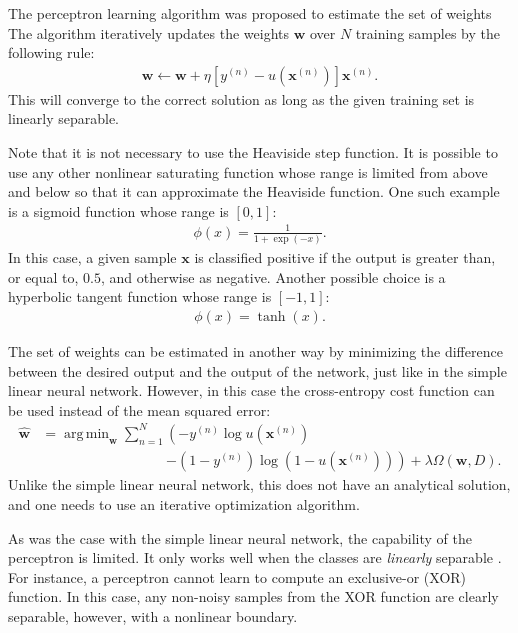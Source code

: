 \documentclass[dissertation,nocontribution,draft*]{aaltoseries}
\newcommand{\vect}[1]{\mathbf{#1}}
\newcommand{\vx}[0]{\vect{x}}
\newcommand{\vw}[0]{\vect{w}}
\DeclareMathOperator*{\argmin}{arg\,min}
\begin{document}
The perceptron learning algorithm was proposed  to estimate
the set of weights
The algorithm iteratively updates the
weights $\vw$ over $N$ training samples by the following
rule:
\begin{align*}
    \vw \leftarrow \vw + \eta \left[ y^{(n)} -
    u\left(\vx^{(n)}\right)
    \right] \vx^{(n)}.
\end{align*}
This will converge to the correct solution as long as the
given training set is linearly separable.

Note that it is not necessary to use the Heaviside step
function. It is possible to use any other nonlinear
saturating function whose range is limited from above and
below so that it can approximate the Heaviside function.
One such example is a sigmoid function whose range is
$\left[ 0, 1 \right]$:
\begin{align}
    \label{eq:sigmoid}
    \phi(x) = \frac{1}{1 + \exp\left( -x\right)}.
\end{align}
In this case, a given sample $\vx$ is classified positive if
the output is greater than, or equal to, $0.5$, and
otherwise as negative. Another possible choice is a
hyperbolic tangent function whose range is $\left[ -1, 1
\right]$:
\begin{align}
    \label{eq:tanh}
    \phi(x) = \tanh(x).
\end{align}

The set of weights can be estimated in another way by
minimizing the difference between the desired output and the
output of the network, just like in the simple linear neural
network. However, in this case the cross-entropy cost
function \citep[see, e.g.][]{Bishop2006} can be used instead
of the mean squared error:
\begin{align}
    \label{eq:crossentropy_cost}
    \hat{\vw} &= \argmin_{\vw} \sum_{n=1}^N \left(-y^{(n)}
    \log u\left(\vx^{(n)}\right)\right.
    \nonumber\\
    &\phantom{= \argmin_{\vw} \sum_{n=1}^N}\left.-\left(1-y^{(n)}\right)
    \log\left( 1 - 
    u\left(\vx^{(n)}\right)\right)\right) 
    + \lambda \Omega
    \left(\vw, D\right).
\end{align}
Unlike the simple linear neural network, this does not have
an analytical solution, and one needs to use an iterative
optimization algorithm.

As was the case with the simple linear neural network, the
capability of the perceptron is limited. It only works well
when the classes are \textit{linearly} separable \citep[see,
e.g.,][]{Minsky1969}. For instance, a perceptron cannot
learn to compute an exclusive-or
(XOR) function. In this
case, any non-noisy samples from the XOR function are
clearly separable, however, with a nonlinear boundary.
\end{document}
